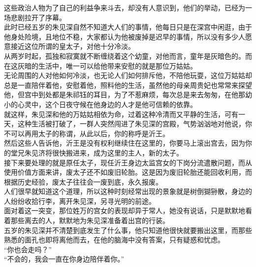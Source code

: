 \begin{multicols}{\theparacolNo}
这些政治人物为了自己的利益争来斗去，却没有人意识到，他们的举动，已经为一场悲剧拉开了序幕。\\

此时已经五岁的朱见深自然不知道大人们的事情，他每日只是在深宫中闲逛，由于他身处险境，且地位不稳，大家都认为他被废掉是迟早的事情，所以没有多少人愿意接近这位所谓的皇太子，对他十分冷淡。\\

从两岁时起，孤独和寂寞就不断缠绕着这个幼童，对他而言，童年是灰暗色的。而在这灰暗的生活中，唯一可以给他带来安慰的就是那位万姑姑。\\

无论周围的人对他如何冷淡，也无论人们如何排斥他，不陪他玩耍，这位万姑姑却总是一直陪伴着他，安慰着他，照料他的生活，虽然他的母亲周贵妃也常常来探望他，但宫中到处都是朱祁钰的耳目，为了不惹麻烦，每次总是来去匆匆，在他那幼小的心灵中，这个日夜守候在他身边的人才是他可信赖的依靠。\\

就这样，朱见深和他的万姑姑相依为命，过着这种冷清而又平静的生活，可有一天，这种生活被打破了，一群人突然闯进了朱见深的宫殿，气势汹汹地对他说，你不可以再用太子的称谓，从此以后，你的称呼是沂王。\\

然后这些人告诉他，沂王是没有权利继续住在这里的，你要马上滚出宫去，因为你的堂兄朱见济将很快搬进来，成为这里的主人，新的太子。\\

接下来要处理的就是原任太子，现任沂王身边太监宫女的下岗分流遣散问题，而从使用价值方面来讲，废太子还不如废旧轮胎。这是因为废旧轮胎还能回收利用，而根据历史经验，废太子往往会一废到底，永久报废。\\

人们很早就知道这个道理，所以这种时刻经常出现的景象就是树倒猢狲散，身边的人纷纷收拾行李，离开朱见深，另寻光明的前途。\\

面对着这一突变，那位姓万的宫女的表现却异于常人，她没有说话，只是默默地看着那些离去的人，默默地为朱见深准备着出宫的行装。\\

五岁的朱见深并不清楚到底发生了什么事，他只知道他很快就要搬出这里，而那些熟悉的面孔也即将离他而去，在他的脑海中没有答案，只有疑惑和忧虑。\\

“你也会走吗？”\\

“不会的，我会一直在你身边陪伴着你。”\\


\end{multicols}
